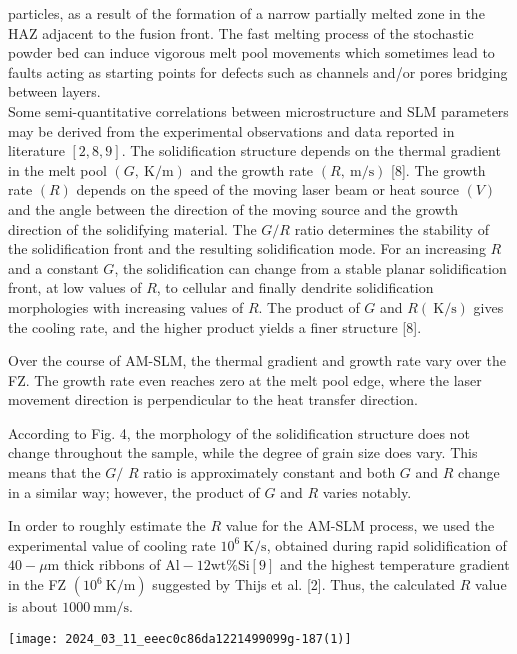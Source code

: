 \documentclass[10pt]{article}
\begin{document}
particles, as a result of the formation of a narrow partially melted zone in the HAZ adjacent to the fusion front. The fast melting process of the stochastic powder bed can induce vigorous melt pool movements which sometimes lead to faults acting as starting points for defects such as channels and/or pores bridging between layers.\\
Some semi-quantitative correlations between microstructure and SLM parameters may be derived from the experimental observations and data reported in literature $[2,8,9]$. The solidification structure depends on the thermal gradient in the melt pool $(G, \mathrm{~K} / \mathrm{m})$ and the growth rate $(R, \mathrm{~m} / \mathrm{s})$ [8]. The growth rate $(R)$ depends on the speed of the moving laser beam or heat source $(V)$ and the angle between the direction of the moving source and the growth direction of the solidifying material. The $G / R$ ratio determines the stability of the solidification front and the resulting solidification mode. For an increasing $R$ and a constant $G$, the solidification can change from a stable planar solidification front, at low values of $R$, to cellular and finally dendrite solidification morphologies with increasing values of $R$. The product of $G$ and $R(\mathrm{~K} / \mathrm{s})$ gives the cooling rate, and the higher product yields a finer structure [8].

Over the course of AM-SLM, the thermal gradient and growth rate vary over the FZ. The growth rate even reaches zero at the melt pool edge, where the laser movement direction is perpendicular to the heat transfer direction.

According to Fig. 4, the morphology of the solidification structure does not change throughout the sample, while the degree of grain size does vary. This means that the $G /$ $R$ ratio is approximately constant and both $G$ and $R$ change in a similar way; however, the product of $G$ and $R$ varies notably.

In order to roughly estimate the $R$ value for the AM-SLM process, we used the experimental value of cooling rate $10^{6} \mathrm{~K} / \mathrm{s}$, obtained during rapid solidification of $40-\mu \mathrm{m}$ thick ribbons of $\mathrm{Al}-12 \mathrm{wt} \% \mathrm{Si}[9]$ and the highest temperature gradient in the FZ $\left(10^{6} \mathrm{~K} / \mathrm{m}\right)$ suggested by Thijs et al. [2]. Thus, the calculated $R$ value is about $1000 \mathrm{~mm} / \mathrm{s}$.

\begin{center}
\texttt{[image: 2024\_03\_11\_eeec0c86da1221499099g-187(1)]}
\end{center}
\end{document}
